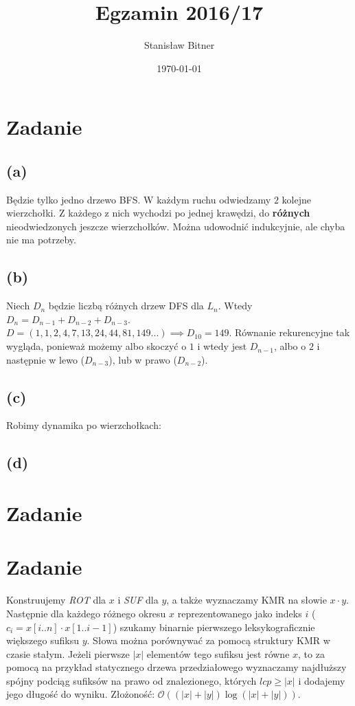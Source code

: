 \documentclass[12pt, a4paper]{article}
\title{Egzamin 2016/17}
\author{Stanisław Bitner}
\date{\today}
\newcommand{\MCALO}{\mathcal{O}}
\newcounter{zadanie}
\newcommand{\zadanie}{\addtocounter{zadanie}{1}\section*{Zadanie \arabic{zadanie}}}
\begin{document}
\maketitle
\zadanie{}
\subsection*{(a)}
Będzie tylko jedno drzewo BFS. W każdym ruchu odwiedzamy $2$ kolejne
wierzchołki. Z każdego z nich wychodzi po jednej krawędzi, do \textbf{różnych}
nieodwiedzonych jeszcze wierzchołków. Można udowodnić indukcyjnie, ale chyba
nie ma potrzeby.

\subsection*{(b)}
Niech $D_n$ będzie liczbą różnych drzew DFS dla $L_n$. Wtedy
$D_n = D_{n-1} + D_{n-2} + D_{n-3}$.\\ $D = (1,1,2,4,7,13,24,44,81,149...)
\implies D_{10} = 149$. Równanie rekurencyjne tak wygląda, ponieważ możemy albo
skoczyć o $1$ i wtedy jest $D_{n-1}$, albo o $2$ i następnie w lewo
($D_{n-3}$), lub w prawo ($D_{n-2}$).

\subsection*{(c)}
Robimy dynamika po wierzchołkach:

\subsection*{(d)}

\zadanie{}

\zadanie{}
Konstruujemy \textit{ROT} dla $x$ i \textit{SUF} dla $y$, a także wyznaczamy
KMR na słowie $x \cdot y$. Następnie dla każdego różnego okresu $x$
reprezentowanego jako indeks $i$ ($c_i = x[i..n] \cdot x[1..i-1]$) szukamy
binarnie pierwszego leksykograficznie większego sufiksu $y$. Słowa można
porównywać za pomocą struktury KMR w czasie stałym. Jeżeli pierwsze $|x|$
elementów tego sufiksu jest równe $x$, to za pomocą na przykład statycznego
drzewa przedziałowego wyznaczamy najdłuższy spójny podciąg sufiksów na prawo od
znalezionego, których $lcp \ge |x|$ i dodajemy jego długość do wyniku.
Złożoność: $\MCALO((|x|+|y|)\log{(|x|+|y|)})$.
\end{document}
